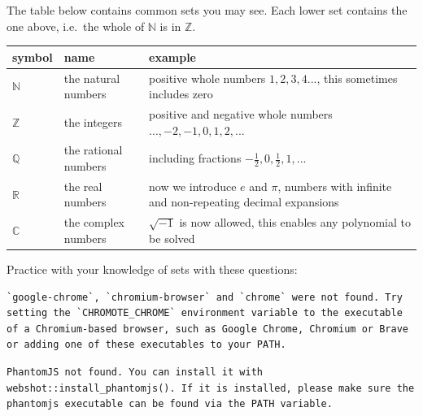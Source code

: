 \documentclass[
  a4paper,
]{scrbook}
\newcounter{none} %
\begin{document}
The table below contains common sets you may see. Each lower set
contains the one above, i.e.~the whole of \(\mathbb{N}\) is in
\(\mathbb{Z}\).

{\def\LTcaptype{none} %
\begin{longtable}[]{@{}
  >{\centering\arraybackslash}p{}
  >{\centering\arraybackslash}p{}
  >{\centering\arraybackslash}p{}@{}}
\toprule\noalign{}
\begin{minipage}[b]{\linewidth}\centering
symbol
\end{minipage} & \begin{minipage}[b]{\linewidth}\centering
name
\end{minipage} & \begin{minipage}[b]{\linewidth}\centering
example
\end{minipage} \\
\midrule\noalign{}
\endhead
\bottomrule\noalign{}
\endlastfoot
\(\mathbb{N}\) & the natural numbers & positive whole numbers
\(1,2,3,4...\), this sometimes includes zero \\
\(\mathbb{Z}\) & the integers & positive and negative whole numbers
\(..., -2, -1, 0, 1,2,...\) \\
\(\mathbb{Q}\) & the rational numbers & including fractions
\(-\frac{1}{2}, 0, \frac{1}{2},1,...\) \\
\(\mathbb{R}\) & the real numbers & now we introduce \(e\) and \(\pi\),
numbers with infinite and non-repeating decimal expansions \\
\(\mathbb{C}\) & the complex numbers & \(\sqrt{-1}\) is now allowed,
this enables any polynomial to be solved \\
\end{longtable}
}

Practice with your knowledge of sets with these questions:

\begin{verbatim}
`google-chrome`, `chromium-browser` and `chrome` were not found. Try setting the `CHROMOTE_CHROME` environment variable to the executable of a Chromium-based browser, such as Google Chrome, Chromium or Brave or adding one of these executables to your PATH.
\end{verbatim}

\begin{verbatim}
PhantomJS not found. You can install it with webshot::install_phantomjs(). If it is installed, please make sure the phantomjs executable can be found via the PATH variable.
\end{verbatim}
\end{document}
